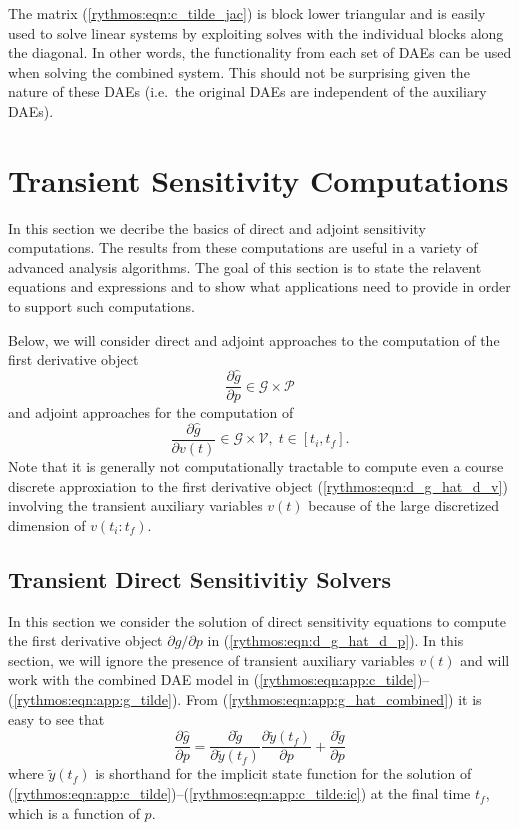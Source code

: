 \documentclass[pdf,ps2pdf,11pt]{SANDreport}
\begin{document}
The matrix (\ref{rythmos:eqn:c_tilde_jac}) is block lower triangular and is
easily used to solve linear systems by exploiting solves with the individual
blocks along the diagonal.  In other words, the functionality from each set of
DAEs can be used when solving the combined system.  This should not be
surprising given the nature of these DAEs (i.e.\ the original DAEs are
independent of the auxiliary DAEs).

\section{Transient Sensitivity Computations}

In this section we decribe the basics of direct and adjoint sensitivity
computations.  The results from these computations are useful in a variety of
advanced analysis algorithms.  The goal of this section is to state the
relavent equations and expressions and to show what applications need to
provide in order to support such computations.

Below, we will consider direct and adjoint approaches to the computation of
the first derivative object
%
\begin{equation}
\frac{\partial \hat{g}}{\partial p} \in \mathcal{G} \times \mathcal{P}
\label{rythmos:eqn:d_g_hat_d_p}
\end{equation}
%
and adjoint approaches for the computation of
%
\begin{equation}
\frac{\partial \hat{g}}{\partial v(t)} \in \mathcal{G} \times \mathcal{V}, \; t \in [t_i,t_f].
\label{rythmos:eqn:d_g_hat_d_v}
\end{equation}
%
Note that it is generally not computationally tractable to compute even a
course discrete approxiation to the first derivative object
(\ref{rythmos:eqn:d_g_hat_d_v}) involving the transient auxiliary variables
$v(t)$ because of the large discretized dimension of $v(t_i:t_f)$.

\subsection{Transient Direct Sensitivitiy Solvers}

In this section we consider the solution of direct sensitivity equations to
compute the first derivative object ${}\partial {}\hat{g} / {}\partial p$ in
(\ref{rythmos:eqn:d_g_hat_d_p}).  In this section, we will ignore the presence
of transient auxiliary variables $v(t)$ and will work with the combined DAE
model in (\ref{rythmos:eqn:app:c_tilde})--(\ref{rythmos:eqn:app:g_tilde}).
From (\ref{rythmos:eqn:app:g_hat_combined}) it is easy to see that
%
\begin{equation}
\frac{\partial \hat{g}}{\partial p}
= \frac{\partial \tilde{g}}{\partial \tilde{y}(t_f)} \frac{\partial \tilde{y}(t_f)}{\partial p} 
+ \frac{\partial \tilde{g}}{\partial p}
\label{rythmos:eqn:app:g_hat_direct}
\end{equation}
%
where $\tilde{y}(t_f)$ is shorthand for the implicit state function for the
solution of
(\ref{rythmos:eqn:app:c_tilde})--(\ref{rythmos:eqn:app:c_tilde:ic}) at the
final time $t_f$, which is a function of $p$.
\end{document}
